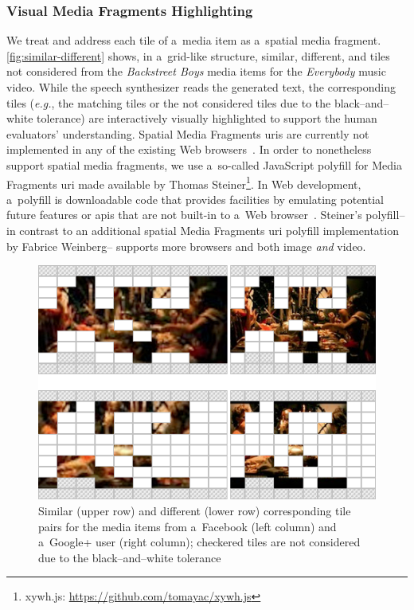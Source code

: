 \documentclass{article}
\begin{document}
\subsubsection{Visual Media Fragments Highlighting}
We treat and address each tile of a~media item as a~spatial media fragment. \autoref{fig:similar-different} shows, in a~grid-like structure, similar, different, and tiles not considered from the \emph{Backstreet Boys} media items for the \emph{Everybody} music video. While the speech synthesizer reads the generated text, the corresponding tiles (\emph{e.g.}, the matching tiles or the not considered tiles due to the black--and--white tolerance) are interactively visually highlighted to support the human evaluators' understanding. Spatial Media Fragments {\sc uri}s are currently not implemented in any of the existing Web browsers~\cite{weinberg2013polyfill}. In order to nonetheless support spatial media fragments, we use a~so-called JavaScript polyfill for Media Fragments {\sc uri} made available by Thomas Steiner\footnote{xywh.js: \url{https://github.com/tomayac/xywh.js}}. In Web development, a~polyfill is downloadable code that provides facilities by emulating potential future features or {\sc api}s that are not built-in to a~Web browser~\cite{sharp2010polyfill}. Steiner's polyfill--in contrast to an additional spatial Media Fragments {\sc uri} polyfill implementation~\cite{weinberg2013polyfill} by Fabrice Weinberg-- supports more browsers and both image \emph{and} video.

\begin{figure}[t!]
  \centering
  \includegraphics[width=0.75\linewidth]{./similar-different.png}
  \caption{Similar (upper row) and different (lower row) corresponding tile pairs for the media items from a~Facebook (left column) and a~Google+ user (right column); checkered tiles are not considered due to the black--and--white tolerance}
  \label{fig:similar-different}
\end{figure}
\end{document}
